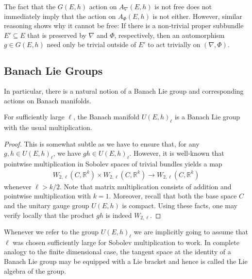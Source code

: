 \documentclass[12pt]{ociamthesis}  %
\begin{document}
\begin{example}\label{ex:not_free_double}
  The fact that the $G(E,h)$ action on $A_\nabla(E,h)$ is not free does not
  immediately imply that the action on $A_\Phi(E,h)$ is not either. However,
  similar reasoning shows why it cannot be free: If there is a non-trivial
  proper subbundle $E'\subseteq E$ that is preserved by $\nabla$ and $\Phi$,
  respectively, then an automorphism $g\in G(E,h)$ need only be trivial
  outside of $E'$ to act trivially on $(\nabla,\Phi)$.
\end{example}


\subsection{Banach Lie Groups}

In particular, there is a natural notion of a Banach Lie group and
corresponding actions on Banach manifolds.

\begin{example}\label{ex:unitary_banach_lie_group}
  For sufficiently large $\ell$, the Banach manifold $U(E,h)_\ell$ is a
  Banach Lie group with the usual multiplication.
  \begin{proof}
    This is somewhat subtle as we have to ensure that, for any
    $g,h\in U(E,h)_\ell$, we have $gh\in U(E,h)_\ell$. However, it
    is well-known that pointwise multiplication
    in Sobolev spaces of trivial bundles yields a map
    \begin{align*}
      W_{2,\ell}(C,\mathbb R^k) \times
      W_{2,\ell}(C,\mathbb R^k) \to
      W_{2,\ell}(C,\mathbb R^k)
    \end{align*}
    whenever $\ell > k/2$. \cite[Theorem 6.1]{behzadan2021}
    Note that matrix multiplication consists of addition and
    pointwise multiplication with $k=1$. Moreover, recall that both
    the base space $C$ and the unitary gauge group $U(E,h)$ is compact.
    Using these facts, one may verify locally that the product $gh$ is indeed $W_{2,\ell}$.
  \end{proof}
\end{example}

Whenever we refer to the group $U(E,h)_\ell$ we are implicitly going to
assume that $\ell$ was chosen sufficiently large for Sobolev multiplication
to work.
In complete analogy to the finite dimensional case, the tangent space
at the identity of a Banach Lie group may be equipped with a Lie bracket
and hence is called the Lie algebra of the group.
\end{document}
